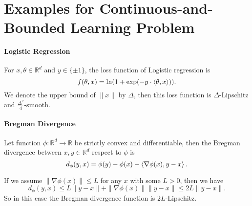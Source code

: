
\newpage
\appendix
\begin{comment}
\begin{center}
    {\LARGE\bf Supplement for Robust and Fully-Dynamic Coreset for Continuous-and-Bounded Learning (With Outliers) Problems}
\end{center}
\bigskip
\end{comment}



\section{Examples for Continuous-and-Bounded Learning Problem}
\label{supp:instance}

\paragraph{Logistic Regression}
For $ x,\theta \in\mathbb{R}^d $ and $ y\in\{\pm 1 \} $, the loss function of Logistic regression is 
\begin{equation}
	f(\theta,x) = \ln (1+\exp(-y\cdot\braket{\theta,x} )).
\end{equation}
We denote the upper bound of $ \|x\| $ by $ \Delta $, then this loss function is $ \Delta $-Lipschitz and $ \frac{\Delta ^2}{4} $-smooth. 


\paragraph{Bregman Divergence~\cite{BanerjeeMDG05}}
Let function $ \phi:\mathbb{R}^d\rightarrow \mathbb{R} $ be strictly convex and differentiable, then the Bregman divergence between $ x,y\in\mathbb{R}^d $ respect to $ \phi $ is 
\begin{equation}
	d_\phi(y,x) = \phi(y)-\phi(x)-\braket{\nabla\phi(x),y-x}.
\end{equation}


If we assume $ \|\nabla\phi(x)\| \leq L $ for any $x $ with some $L>0$, then we have 
\[ d_\phi(y,x)\leq  L\|y-x\|+\|\nabla \phi(x)\|\|y-x\| \leq 2L\|y-x\|.  \]
So in this case the Bregman divergence function is $ 2L $-Lipschitz.

